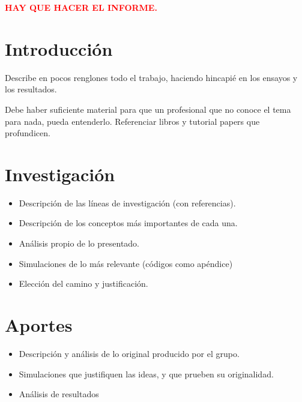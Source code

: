 







\tableofcontents
\newpage

\begin{multicols}{2}

\begin{center}
	\Huge{\textcolor{red}{\textbf{HAY QUE HACER EL INFORME.}}}
\end{center}

\section{Introducción}
	Describe en pocos renglones todo el trabajo, haciendo hincapié en los ensayos y los resultados.
	
	Debe haber suficiente material para que un profesional que no conoce el tema para nada, pueda entenderlo. Referenciar libros y tutorial papers que profundicen.
	
\section{Investigación}
\begin{itemize}
	\item Descripción de las líneas de investigación (con referencias).
	\item Descripción de los conceptos más importantes de cada una.
	\item Análisis propio de lo presentado.
	\item Simulaciones de lo más relevante (códigos como apéndice)
	\item Elección del camino y justificación.
\end{itemize}

\section{Aportes}
\begin{itemize}
	\item Descripción y análisis de lo original producido por el grupo.
	\item Simulaciones que justifiquen las ideas, y que prueben su originalidad.
	\item Análisis de resultados
\end{itemize}


\end{multicols}
